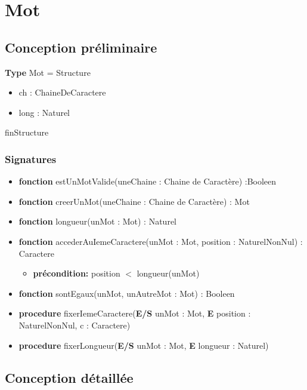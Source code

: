 \documentclass{article}
\begin{document}
    \pagestyle{empty}
    \noindent

    \section*{Mot}
    \subsection*{Conception préliminaire}

    \textbf{Type} Mot = Structure
	\begin{itemize}[label=$\ $, leftmargin=2cm]
		 \item ch : ChaineDeCaractere
		 \item long : Naturel
	\end{itemize}
    finStructure
    
    \subsubsection*{Signatures}

	\begin{itemize}[label=$\ $, leftmargin=1cm]
		 \item \textbf{fonction} estUnMotValide(uneChaine : Chaine de Caractère) :Booleen
		 \item \textbf{fonction} creerUnMot(uneChaine : Chaine de Caractère) : Mot
		 \item \textbf{fonction} longueur(unMot : Mot) : Naturel
		 \item \textbf{fonction} accederAuIemeCaractere(unMot : Mot, position : NaturelNonNul) : Caractere
		 \begin{itemize}[label=$| $]
            \item \textbf{précondition:} position $<$ longueur(unMot)
         \end{itemize}
         \item \textbf{fonction} sontEgaux(unMot, unAutreMot : Mot) : Booleen
         \item \textbf{procedure} fixerIemeCaractere(\textbf{E/S} unMot : Mot, \textbf{E} position : NaturelNonNul, c : Caractere)
         \item \textbf{procedure} fixerLongueur(\textbf{E/S} unMot : Mot, \textbf{E} longueur : Naturel)
	\end{itemize} 

    \subsection*{Conception détaillée}
\end{document}
